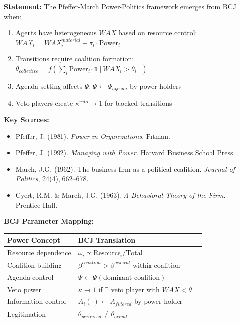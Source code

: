 \begin{tcolorbox}[colback=purple!5!white, colframe=purple!75!black,
    title=Theorem BCJ-T41: Power \& Politics as Special Case]
\textbf{Statement:} The Pfeffer-March Power-Politics framework emerges from BCJ when:
\begin{enumerate}[nosep]
\item Agents have heterogeneous $WAX$ based on resource control: $WAX_i = WAX_i^{material} + \pi_i \cdot \text{Power}_i$
\item Transitions require coalition formation: $\theta_{collective} = f(\sum_i \text{Power}_i \cdot \mathbf{1}[WAX_i > \theta_i])$
\item Agenda-setting affects $\Psi$: $\Psi \leftarrow \Psi_{agenda}$ by power-holders
\item Veto players create $\kappa^{veto} \to 1$ for blocked transitions
\end{enumerate}

\textbf{Key Sources:}
\begin{itemize}[nosep]
\item Pfeffer, J. (1981). \textit{Power in Organizations}. Pitman.
\item Pfeffer, J. (1992). \textit{Managing with Power}. Harvard Business School Press.
\item March, J.G. (1962). The business firm as a political coalition. \textit{Journal of Politics}, 24(4), 662--678.
\item Cyert, R.M. \& March, J.G. (1963). \textit{A Behavioral Theory of the Firm}. Prentice-Hall.
\end{itemize}

\textbf{BCJ Parameter Mapping:}
\begin{center}
\begin{tabular}{lll}
\toprule
\textbf{Power Concept} & \textbf{BCJ Translation} \\
\midrule
Resource dependence & $\omega_i \propto \text{Resource}_i / \text{Total}$ \\
Coalition building & $\beta^{coalition} > \beta^{general}$ within coalition \\
Agenda control & $\Psi \leftarrow \Psi(\text{dominant coalition})$ \\
Veto power & $\kappa \to 1$ if $\exists$ veto player with $WAX < \theta$ \\
Information control & $A_i(\cdot) \leftarrow A_{filtered}$ by power-holder \\
Legitimation & $\theta_{perceived} \neq \theta_{actual}$ \\
\bottomrule
\end{tabular}
\end{center}


\end{tcolorbox}
